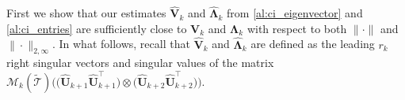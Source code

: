 \documentclass[10pt]{article}
\newcommand{\0}{{\mathbf{0}}}
\newcommand{\1}{{\mathbf{1}}}
\newcommand{\U}{{\mathbf{U}}}
\renewcommand{\t}{^{\top}}
\newcommand{\uhat}{\mathbf{\hat{U}}}
\renewcommand{\tilde}{\widetilde}
\renewcommand{\hat}{\widehat}
\renewcommand{\hat}{\widehat}
\begin{document}
%
First  we show that our estimates $\mathbf{\hat V}_k$ and $\mathbf{\hat \Lambda}_k$ from \cref{al:ci_eigenvector} and \cref{al:ci_entries} are sufficiently close to $\mathbf{V}_k$ and $\mathbf{\Lambda}_k$ with respect to both $\|\cdot\|$ and $\|\cdot\|_{2,\infty}$. In what follows, recall that $\mathbf{\hat V}_k$ and $\mathbf{\hat \Lambda}_k$ are defined as the leading $r_k$ right singular vectors and singular values of the matrix $\mathcal{M}_k(\mathcal{\tilde T}) \bigg( \big( \uhat_{k+1} \uhat_{k+1}\t \big) \otimes \big( \uhat_{k+2} \uhat_{k+2}\t \big) \bigg)$.  
\end{document}
